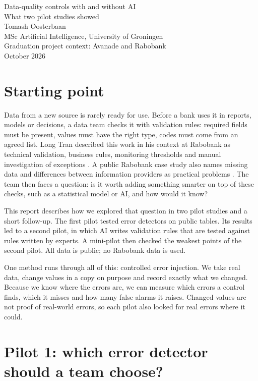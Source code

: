 \documentclass[11pt,a4paper]{article}
\begin{document}
\begin{center}
{\Large Data-quality controls with and without AI}\\[0.4em]
{\large What two pilot studies showed}\\[0.8em]
Tomash Oosterbaan\\
MSc Artificial Intelligence, University of Groningen\\
Graduation project context: Avanade and Rabobank\\
October 2026
\end{center}

\section{Starting point}

Data from a new source is rarely ready for use. Before a bank uses it in reports, models or decisions, a data team checks it with validation rules: required fields must be present, values must have the right type, codes must come from an agreed list. Long Tran described this work in his context at Rabobank as technical validation, business rules, monitoring thresholds and manual investigation of exceptions \cite{tran}. A public Rabobank case study also names missing data and differences between information providers as practical problems \cite{alderse}. The team then faces a question: is it worth adding something smarter on top of these checks, such as a statistical model or AI, and how would it know?

This report describes how we explored that question in two pilot studies and a short follow-up. The first pilot tested error detectors on public tables. Its results led to a second pilot, in which AI writes validation rules that are tested against rules written by experts. A mini-pilot then checked the weakest points of the second pilot. All data is public; no Rabobank data is used.

One method runs through all of this: controlled error injection. We take real data, change values in a copy on purpose and record exactly what we changed. Because we know where the errors are, we can measure which errors a control finds, which it misses and how many false alarms it raises. Changed values are not proof of real-world errors, so each pilot also looked for real errors where it could.

\section{Pilot 1: which error detector should a team choose?}
\end{document}
